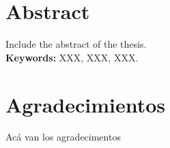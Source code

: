 \documentclass[letterpaper,11pt]{report}
\begin{document}
\chapter*{\centering Abstract}
Include the abstract of the thesis.\\
\textbf{Keywords:} XXX, XXX, XXX.
\newpage

\chapter*{\centering Agradecimientos}
Acá van los agradecimentos
\noindent 

\setcounter{tocdepth}{3}
\tableofcontents
\listoffigures
\listoftables
\pagestyle{headings}









\end{document}

